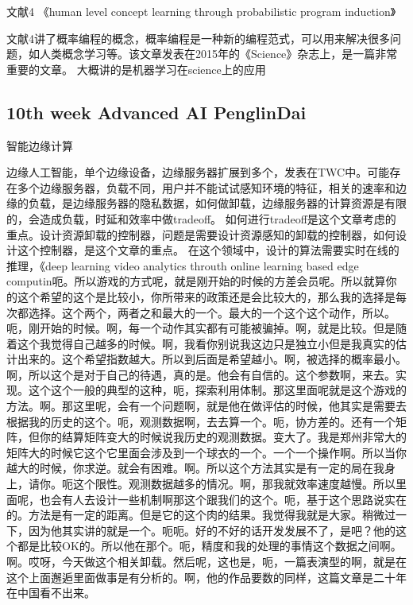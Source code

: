 \documentclass[12pt,a4paper]{article}%
\begin{document}
	文献4 《human level concept learning through probabilistic program induction》
	
	文献4讲了概率编程的概念，概率编程是一种新的编程范式，可以用来解决很多问题，如人类概念学习等。该文章发表在2015年的《Science》杂志上，是一篇非常重要的文章。
	大概讲的是机器学习在science上的应用
	\subsection{10th week Advanced AI PenglinDai}
	智能边缘计算

	边缘人工智能，单个边缘设备，边缘服务器扩展到多个，发表在TWC中。可能存在多个边缘服务器，负载不同，用户并不能试试感知环境的特征，相关的速率和边缘的负载，是边缘服务器的隐私数据，如何做卸载，边缘服务器的计算资源是有限的，会造成负载，时延和效率中做tradeoff。
	如何进行tradeoff是这个文章考虑的重点。设计资源卸载的控制器，问题是需要设计资源感知的卸载的控制器，如何设计这个控制器，是这个文章的重点。
	在这个领域中，设计的算法需要实时在线的推理，《deep learning video analytics throuth online learning based edge computin呃。所以游戏的方式呢，就是刚开始的时候的方差会员呢。所以就算你的这个希望的这个是比较小，你所带来的政策还是会比较大的，那么我的选择是每次都选择。这个两个，两者之和最大的一个。最大的一个这个这个动作，所以。呃，刚开始的时候。啊，每一个动作其实都有可能被骗掉。啊，就是比较。但是随着这个我觉得自己越多的时候。啊，我看你别说我这边只是独立小但是我真实的估计出来的。这个希望指数越大。所以到后面是希望越小。啊，被选择的概率最小。啊，所以这个是对于自己的待遇，真的是。他会有自信的。这个参数啊，来去。实现。这个这个一般的典型的这种，呃，探索利用体制。那这里面呢就是这个游戏的方法。啊。那这里呢，会有一个问题啊，就是他在做评估的时候，他其实是需要去根据我的历史的这个。呃，观测数据啊，去去算一个。呃，协方差的。还有一个矩阵，但你的结算矩阵变大的时候说我历史的观测数据。变大了。我是郑州非常大的矩阵大的时候它这个它里面会涉及到一个球衣的一个。一个一个操作啊。所以当你越大的时候，你求逆。就会有困难。啊。所以这个方法其实是有一定的局在我身上，请你。呃这个限性。观测数据越多的情况。啊，那我就效率速度越慢。所以里面呢，也会有人去设计一些机制啊那这个跟我们的这个。呃，基于这个思路说实在的。方法是有一定的距离。但是它的这个肉的结果。我觉得我就是大家。稍微过一下，因为他其实讲的就是一个。呃呃。好的不好的话开发发展不了，是吧？他的这个都是比较OK的。所以他在那个。呃，精度和我的处理的事情这个数据之间啊。啊。哎呀，今天做这个相关卸载。然后呢，这也是，呃，一篇表演型的啊，就是在这个上面邂逅里面做事是有分析的。啊，他的作品要数的同样，这篇文章是二十年在中国看不出来。
	
\end{document}
